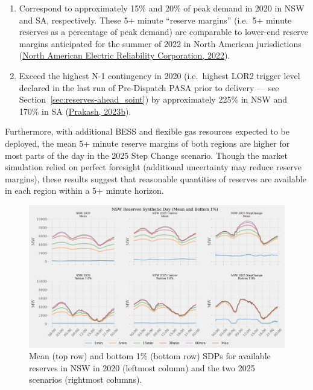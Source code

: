 \documentclass[12pt,a4paper,]{report}
\providecommand{\tightlist}{%
  \setlength{\itemsep}{0pt}\setlength{\parskip}{0pt}}
\begin{document}
\begin{enumerate}
\def\labelenumi{\arabic{enumi}.}
\tightlist
\item
  Correspond to approximately 15\% and 20\% of peak demand in 2020 in
  NSW and SA, respectively. These 5+ minute ``reserve margins'' (i.e.~5+
  minute reserves as a percentage of peak demand) are comparable to
  lower-end reserve margins anticipated for the summer of 2022 in North
  American jurisdictions
  (\protect\hyperlink{ref-northamericanelectricreliabilitycorporation2022SummerReliability2022}{North
  American Electric Reliability Corporation, 2022}).
\item
  Exceed the highest N-1 contingency in 2020 (i.e.~highest LOR2 trigger
  level declared in the last run of Pre-Dispatch PASA prior to delivery
  --- see Section~\ref{sec:reserves-ahead_soint}) by approximately 225\%
  in NSW and 170\% in SA
  (\protect\hyperlink{ref-prakashNEMSEER2023}{Prakash, 2023b}).
\end{enumerate}

Furthermore, with additional BESS and flexible gas resources expected to
be deployed, the mean 5+ minute reserve margins of both regions are
higher for most parts of the day in the 2025 Step Change scenario.
Though the market simulation relied on perfect foresight (additional
uncertainty may reduce reserve margins), these results suggest that
reasonable quantities of reserves are available in each region within a
5+ minute horizon.

\begin{figure}
\hypertarget{fig:nswreserves}{%
\centering
\includegraphics[width=1\textwidth,height=\textheight]{./source/figures/NSW_reserves_all_profiles_by_di.png}
\caption[NSW available reserves SDPs]{Mean (top row) and bottom 1\%
(bottom row) SDPs for available reserves in NSW in 2020 (leftmost
column) and the two 2025 scenarios (rightmost
columns).}\label{fig:nswreserves}
}
\end{figure}
\end{document}
